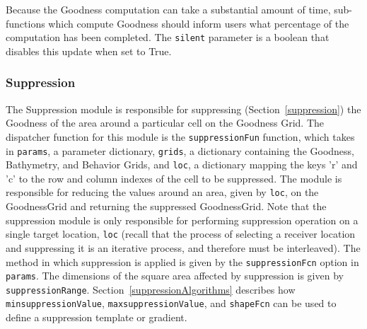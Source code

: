 Because the Goodness computation can take a substantial amount of time, sub-functions which compute Goodness should inform users what percentage of the computation has been completed.  The \texttt{silent} parameter is a boolean that disables this update when set to True.

\subsubsection{Suppression}
The Suppression module is responsible for suppressing (Section~\ref{suppression}) the Goodness of the area around a particular cell on the Goodness Grid.   The dispatcher function for this module is the \texttt{suppressionFun} function, which takes in \texttt{params}, a parameter dictionary, \texttt{grids}, a dictionary containing the Goodness, Bathymetry, and Behavior Grids, and \texttt{loc}, a dictionary mapping the keys 'r' and 'c' to the row and column indexes of the cell to be suppressed.  The module is responsible for reducing the values around an area, given by \texttt{loc}, on the GoodnessGrid and returning the suppressed GoodnessGrid.  Note that the suppression module is only responsible for performing suppression operation on a single target location, \texttt{loc} (recall that the process of selecting a receiver location and suppressing it is an iterative process, and therefore must be interleaved).  The method in which suppression is applied is given by the \texttt{suppressionFcn} option in \texttt{params}.  The dimensions of the square area affected by suppression is given by \texttt{suppressionRange}.  Section~\ref{suppressionAlgorithms} describes how \texttt{minsuppressionValue}, \texttt{maxsuppressionValue}, and \texttt{shapeFcn} can be used to define a suppression template or gradient.


